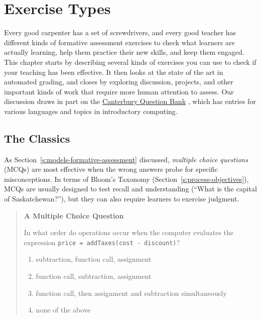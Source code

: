 \chapter{Exercise Types}\label{s:exercises}

Every good carpenter has a set of screwdrivers, and every good teacher
has different kinds of formative assessment exercises to check what
learners are actually learning, help them practice their new skills, and
keep them engaged. This chapter starts by describing several kinds of
exercises you can use to check if your teaching has been effective. It
then looks at the state of the art in automated grading, and closes by
exploring discussion, projects, and other important kinds of work that
require more human attention to assess. Our discussion draws in part on
the \href{http://web-cat.org/questionbank/}{Canterbury Question Bank}
\cite{Sand2013}, which has entries for various languages and topics
in introductory computing.

\section{The Classics}\label{s:exercises-classics}

As Section~\ref{s:models-formative-assessment} discussed, \emph{multiple
choice questions} (MCQs) are most effective when the wrong answers probe
for specific misconceptions. In terms of Bloom's Taxonomy
(Section~\ref{s:process-objectives}), MCQs are usually designed to test
recall and understanding (``What is the capital of Saskatchewan?''), but
they can also require learners to exercise judgment.

\begin{quote}\setlength{\parindent}{0pt}
\textbf{A Multiple Choice Question}

In what order do operations occur when the computer evaluates the
expression \texttt{price\ =\ addTaxes(cost\ -\ discount)}?

\begin{enumerate}
\tightlist
\item
  subtraction, function call, assignment
\item
  function call, subtraction, assignment
\item
  function call, then assignment and subtraction simultaneously
\item
  none of the above
\end{enumerate}
\end{quote}

